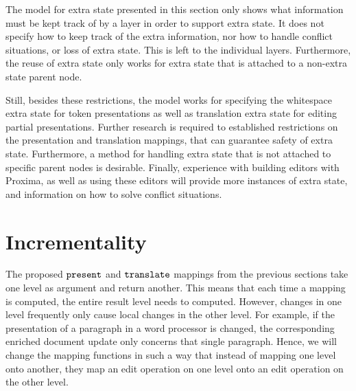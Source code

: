The model for extra state presented in this section only shows what information must be kept track of by a layer in order to support extra state. It does not specify how to keep track of the extra information, nor how to handle conflict situations, or loss of extra state. This is left to the individual layers. Furthermore, the reuse of extra state only works for extra state that is attached to a non-extra state parent node. 

Still, besides these restrictions, the model works for specifying the whitespace extra state for token presentations as well as translation extra state for editing partial presentations. Further research is required to established restrictions on the presentation and translation mappings, that can guarantee safety of extra state. Furthermore, a method for handling extra state that is not attached to specific parent nodes is desirable. Finally, experience with building editors with Proxima, as well as using these editors will provide more instances of extra state, and information on how to solve conflict situations.







%																
\section{Incrementality}

The proposed ${\tt present}$ and ${\tt translate}$ mappings from the previous sections take one level as argument and return another. This means that each time a mapping is computed, the entire result level needs to computed. However, changes in one level frequently only cause local changes in the other level. For example, if the presentation of a paragraph in a word processor is changed, the corresponding enriched document update only concerns that single paragraph. Hence, we will change the mapping functions in such a way that instead of mapping one level onto another, they map an edit operation on one level onto an edit operation on the other level. 

